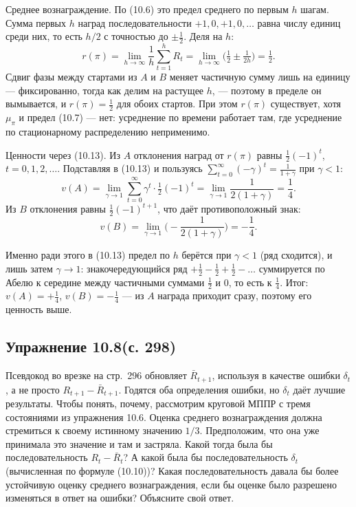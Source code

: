 \begin{solution}
    Среднее вознаграждение. По (10.6) это предел среднего по первым $h$ шагам.
    Сумма первых $h$ наград последовательности $+1,0,+1,0,\dots$ равна числу
    единиц среди них, то есть $h/2$ с точностью до $\pm\tfrac12$. Деля на $h$:
    \begin{equation*}
        r(\pi) = \lim_{h\to\infty}\frac1h\sum_{t=1}^h R_t
        = \lim_{h\to\infty}\Big(\tfrac12 \pm \tfrac{1}{2h}\Big) = \tfrac12.
    \end{equation*}
    Сдвиг фазы между стартами из $A$ и $B$ меняет частичную сумму лишь на единицу
    --- фиксированно, тогда как делим на растущее $h$, --- поэтому в пределе он
    вымывается, и $r(\pi)=\tfrac12$ для обоих стартов. При этом $r(\pi)$ существует,
    хотя $\mu_\pi$ и предел (10.7) --- нет: усреднение по времени работает там, где
    усреднение по стационарному распределению неприменимо.

    Ценности через (10.13). Из $A$ отклонения наград от $r(\pi)$ равны
    $\tfrac12(-1)^t$, $t=0,1,2,\dots$. Подставляя в (10.13) и пользуясь
    $\sum_{t=0}^\infty(-\gamma)^t = \tfrac{1}{1+\gamma}$ при $\gamma<1$:
    \begin{equation*}
        v(A) = \lim_{\gamma\to1}\sum_{t=0}^\infty \gamma^t\cdot\tfrac12(-1)^t
        = \lim_{\gamma\to1}\frac{1}{2(1+\gamma)} = \frac14.
    \end{equation*}
    Из $B$ отклонения равны $\tfrac12(-1)^{t+1}$, что даёт противоположный знак:
    \begin{equation*}
        v(B) = \lim_{\gamma\to1}\Big(-\frac{1}{2(1+\gamma)}\Big) = -\frac14.
    \end{equation*}

    Именно ради этого в (10.13) предел по $h$ берётся при $\gamma<1$ (ряд
    сходится), и лишь затем $\gamma\to1$: знакочередующийся ряд $+\tfrac12-\tfrac12
    +\tfrac12-\dots$ суммируется по Абелю к середине между частичными суммами
    $\tfrac12$ и $0$, то есть к $\tfrac14$. Итог: $v(A)=+\tfrac14$,
    $v(B)=-\tfrac14$ --- из $A$ награда приходит сразу, поэтому его ценность выше.
\end{solution}

\subsection{Упражнение 10.8(с. 298)}
Псевдокод во врезке на стр.~296 обновляет $\bar R_{t+1}$, используя в качестве
ошибки $\delta_t$, а не просто $R_{t+1}-\bar R_{t+1}$. Годятся оба определения
ошибки, но $\delta_t$ даёт лучшие результаты. Чтобы понять, почему, рассмотрим
круговой МППР с тремя состояниями из упражнения 10.6. Оценка среднего
вознаграждения должна стремиться к своему истинному значению $1/3$. Предположим,
что она уже принимала это значение и там и застряла. Какой тогда была бы
последовательность $R_t-\bar R_t$? А какой была бы последовательность $\delta_t$
(вычисленная по формуле (10.10))? Какая последовательность давала бы более
устойчивую оценку среднего вознаграждения, если бы оценке было разрешено
изменяться в ответ на ошибки? Объясните свой ответ.

